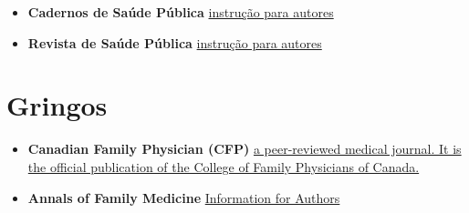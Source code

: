 \documentclass[]{book}
\begin{document}
\begin{itemize}
\item
  \textbf{Cadernos de Saúde Pública} \href{http://cadernos.ensp.fiocruz.br/csp/submissao/instrucao-para-autores}{instrução para autores}
\item
  \textbf{Revista de Saúde Pública} \href{http://www.rsp.fsp.usp.br/instrucoes-aos-autores/\#artigos-originais}{instrução para autores}
\end{itemize}

\hypertarget{gringos}{%
\section*{Gringos}\label{gringos}}

\begin{itemize}
\item
  \textbf{Canadian Family Physician (CFP)} \href{https://www.cfp.ca/content/authors-reviewers}{a peer-reviewed medical journal. It is the official publication of the College of Family Physicians of Canada.}
\item
  \textbf{Annals of Family Medicine} \href{http://www.annfammed.org/}{Information for Authors}
\end{itemize}


\end{document}
